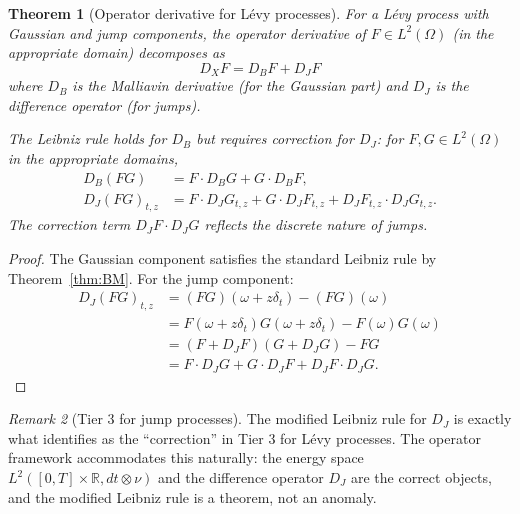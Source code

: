 \documentclass[12pt]{article}
\theoremstyle{plain}
\newtheorem{theorem}{Theorem}[section]
\theoremstyle{definition}
\theoremstyle{remark}
\newtheorem{remark}[theorem]{Remark}
\newcommand{\R}{\mathbb{R}}
\begin{document}
\begin{theorem}[Operator derivative for L\'{e}vy processes]\label{thm:Levy-operator-derivative}
For a L\'{e}vy process with Gaussian and jump components, the operator derivative of $F \in L^2(\Omega)$ (in the appropriate domain) decomposes as
\begin{equation}\label{eq:Levy-D-decomp}
D_X F = D_B F + D_J F
\end{equation}
where $D_B$ is the Malliavin derivative (for the Gaussian part) and $D_J$ is the difference operator (for jumps).

The Leibniz rule holds for $D_B$ but requires correction for $D_J$: for $F, G \in L^2(\Omega)$ in the appropriate domains,
\begin{align}
D_B(FG) &= F \cdot D_B G + G \cdot D_B F, \label{eq:Leibniz-Gaussian} \\
D_J(FG)_{t,z} &= F \cdot D_J G_{t,z} + G \cdot D_J F_{t,z} + D_J F_{t,z} \cdot D_J G_{t,z}. \label{eq:Leibniz-jump}
\end{align}
The correction term $D_J F \cdot D_J G$ reflects the discrete nature of jumps.
\end{theorem}

\begin{proof}
The Gaussian component satisfies the standard Leibniz rule by Theorem~\ref{thm:BM}. For the jump component:
\begin{align}
D_J(FG)_{t,z} &= (FG)(\omega + z\delta_t) - (FG)(\omega) \label{eq:jump-Leibniz-1} \\
&= F(\omega + z\delta_t) G(\omega + z\delta_t) - F(\omega) G(\omega) \label{eq:jump-Leibniz-2} \\
&= (F + D_J F)(G + D_J G) - FG \label{eq:jump-Leibniz-3} \\
&= F \cdot D_J G + G \cdot D_J F + D_J F \cdot D_J G. \label{eq:jump-Leibniz-4}
\end{align}
\end{proof}

\begin{remark}[Tier 3 for jump processes]\label{rmk:Tier3-jumps}
The modified Leibniz rule for $D_J$ is exactly what \cite{Fontes2026d} identifies as the ``correction'' in Tier 3 for L\'{e}vy processes. The operator framework accommodates this naturally: the energy space $L^2([0,T] \times \R, dt \otimes \nu)$ and the difference operator $D_J$ are the correct objects, and the modified Leibniz rule is a theorem, not an anomaly.
\end{remark}

\end{document}
